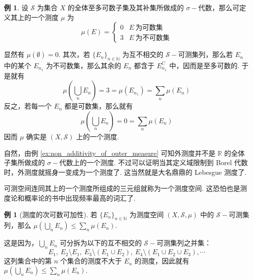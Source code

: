 \documentclass[12pt, a4paper, oneside]{book}
\numberwithin{figure}{section}
\theoremstyle{definition}
\newtheorem{example}[theorem]{例}
\begin{document}
\begin{example}
    设 $\mathcal S$ 为集合 $X$ 的全体至多可数子集及其补集所做成的 $\sigma-$代数，那么可定义其上的一个测度 $\mu$ 为 
    \begin{equation}
        \mu(E) = \begin{cases}
            0&E\ \text{为可数集}\\
            3&E\ \text{为不可数集}
        \end{cases}
    \end{equation}
\end{example}

显然有 $\mu(\emptyset)=0.$ 其次，若 $\{E_n\}_{n\in\mathbb N}$ 为互不相交的 $\mathcal S-$可测集列，那么若 $E_n$ 中的某个 $E_{n_1}$ 为不可数集，那么其余的 $E_n$ 都含于 $E_{n_1}^C$ 中，因而是至多可数的. 于是就有
\begin{equation}
    \mu\left(\bigcup_n E_n\right) = 3 = \mu(E_{n_1})= \sum_n \mu(E_n)
\end{equation}
反之，若每一个 $E_n$ 都是可数集，那么就有
\begin{equation}
    \mu\left(\bigcup_n E_n\right) = 0 = \sum_n \mu(E_n)
\end{equation}
因而 $\mu$ 确实是 $(X,\mathcal S)$ 上的一个测度.

自然，由例 \eqref{ex:non_additivity_of_outer_measure} 可知外测度并不是 $\mathbb R$ 的全体子集所做成的 $\sigma-$代数上的一个测度. 
不过可以证明当其定义域限制到 Borel 代数时，外测度就摇身一变成为一个测度了. 这当然就是大名鼎鼎的 Lebesgue 测度了.

可测空间连同其上的一个测度所组成的三元组就称为一个测度空间. 这恐怕也是测度论和概率论的书中出现频率最高的词汇了.


\begin{example}[测度的次可数可加性]
    若 $\{E_n\}_{n\in\mathbb N}$ 为测度空间 $(X,\mathcal S,\mu)$ 中的 $\mathcal S-$可测集列，那么 $\mu(\bigcup_n E_n)\leq \sum_n \mu(E_n).$
\end{example}
这是因为，$\bigcup_n E_n$ 可分拆为以下的互不相交的 $\mathcal S-$可测集列之并集：
\begin{equation}
    E_1,\ E_2\setminus E_1,\ E_3\setminus(E_1\cup E_2),\ E_4\setminus(E_1\cup E_2\cup E_3),\cdots
\end{equation}
这列集合中的第 $n$ 个集合的测度不大于 $E_n$ 的测度，因此就有 $\mu(\bigcup_n E_n)\leq \sum_n \mu(E_n).$
\end{document}
